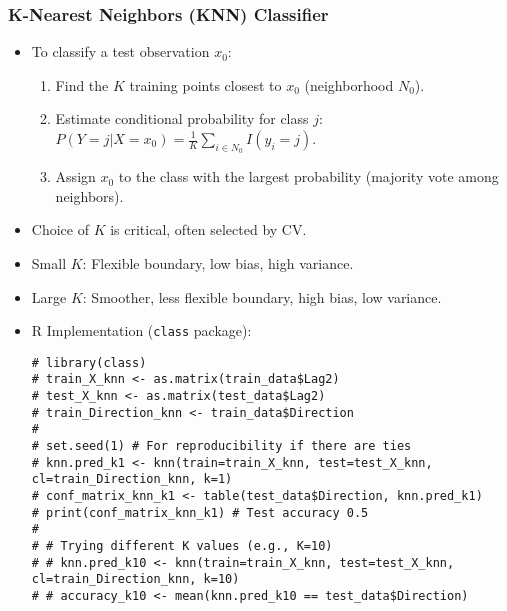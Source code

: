 \documentclass[12pt,a4paper]{article}
\newcommand{\Rpackage}[1]{\texttt{#1}} %
\begin{document}
\begin{itemize}
    \subsubsection{K-Nearest Neighbors (KNN) Classifier}
        \begin{itemize}
            \item To classify a test observation $x_0$:
                \begin{enumerate}
                    \item Find the $K$ training points closest to $x_0$ (neighborhood $N_0$).
                    \item Estimate conditional probability for class $j$: $P(Y=j|X=x_0) = \frac{1}{K} \sum_{i \in N_0} I(y_i=j)$.
                    \item Assign $x_0$ to the class with the largest probability (majority vote among neighbors).
                \end{enumerate}
            \item Choice of $K$ is critical, often selected by CV.
            \item Small $K$: Flexible boundary, low bias, high variance.
            \item Large $K$: Smoother, less flexible boundary, high bias, low variance.
            \item R Implementation (\Rpackage{class} package):
\begin{lstlisting}[caption={KNN Classification (from ex4.13.R for Weekly data)}]
# library(class)
# train_X_knn <- as.matrix(train_data$Lag2)
# test_X_knn <- as.matrix(test_data$Lag2)
# train_Direction_knn <- train_data$Direction
# 
# set.seed(1) # For reproducibility if there are ties
# knn.pred_k1 <- knn(train=train_X_knn, test=test_X_knn, cl=train_Direction_knn, k=1)
# conf_matrix_knn_k1 <- table(test_data$Direction, knn.pred_k1)
# print(conf_matrix_knn_k1) # Test accuracy 0.5
# 
# # Trying different K values (e.g., K=10)
# # knn.pred_k10 <- knn(train=train_X_knn, test=test_X_knn, cl=train_Direction_knn, k=10)
# # accuracy_k10 <- mean(knn.pred_k10 == test_data$Direction)
\end{lstlisting}
        \end{itemize}

\end{itemize}
\end{document}
